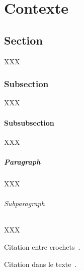 \chapter*{Contexte}
\label{chap:contexte}

\section{Section}

XXX

\subsection{Subsection}

XXX

\subsubsection{Subsubsection}

XXX

\paragraph{Paragraph}

XXX

\subparagraph{Subparagraph}

XXX

Citation entre crochets~\citep{ref1,ref2}.

Citation dans le texte~\citet{ref3}.

